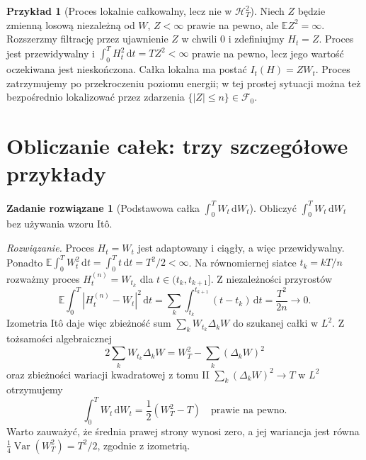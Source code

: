 \documentclass[11pt,a4paper,oneside]{report}
\numberwithin{equation}{chapter}
\theoremstyle{plain}
\theoremstyle{definition}
\newtheorem{przyklad}{Przykład}[chapter]
\newtheorem{zadanie}{Zadanie rozwiązane}[chapter]
\theoremstyle{remark}
\newcommand{\E}{\mathbb{E}}
\newcommand{\Var}{\operatorname{Var}}
\newcommand{\calF}{\mathcal{F}}
\newcommand{\calH}{\mathcal{H}}
\newcommand{\dd}{\mathrm{d}}
\begin{document}
\begin{przyklad}[Proces lokalnie całkowalny, lecz nie w $\calH_T^2$]
Niech $Z$ będzie zmienną losową niezależną od $W$,
$Z<\infty$ prawie na pewno, ale $\E Z^2=\infty$.
Rozszerzmy filtrację przez ujawnienie $Z$ w chwili $0$
i zdefiniujmy $H_t=Z$. Proces jest przewidywalny i
$\int_0^TH_t^2\,\dd t=TZ^2<\infty$ prawie na pewno,
lecz jego wartość oczekiwana jest nieskończona.
Całka lokalna ma postać $I_t(H)=ZW_t$.
Proces zatrzymujemy po przekroczeniu poziomu energii;
w tej prostej sytuacji można też bezpośrednio lokalizować
przez zdarzenia $\{|Z|\le n\}\in\calF_0$.
\end{przyklad}

\section{Obliczanie całek: trzy szczegółowe przykłady}\label{sec:volIII:02:07}
\begin{zadanie}[Podstawowa całka $\int_0^T W_t\,\dd W_t$]\label{zad:W-dW}
Obliczyć $\int_0^T W_t\,\dd W_t$ bez używania wzoru Itô.

\emph{Rozwiązanie.}
Proces $H_t=W_t$ jest adaptowany i ciągły,
a więc przewidywalny. Ponadto
$\E\int_0^TW_t^2\,\dd t=\int_0^Tt\,\dd t=T^2/2<\infty$.
Na równomiernej siatce $t_k=kT/n$ rozważmy proces
$H_t^{(n)}=W_{t_k}$ dla $t\in(t_k,t_{k+1}]$.
Z niezależności przyrostów
\[
\E\int_0^T|H_t^{(n)}-W_t|^2\,\dd t
=\sum_k\int_{t_k}^{t_{k+1}}(t-t_k)\,\dd t
=\frac{T^2}{2n}\longrightarrow0.
\]
Izometria Itô daje więc zbieżność sum
$\sum_kW_{t_k}\Delta_kW$ do szukanej całki w $L^2$.
Z tożsamości algebraicznej
\[
2\sum_kW_{t_k}\Delta_kW
=W_T^2-\sum_k(\Delta_kW)^2
\]
oraz zbieżności wariacji kwadratowej z tomu II
$\sum_k(\Delta_kW)^2\to T$ w $L^2$ otrzymujemy
\[
\int_0^TW_t\,\dd W_t=\frac12(W_T^2-T)
\quad\text{prawie na pewno}.
\tag{2.13}\label{eq:W-dW}
\]
Warto zauważyć, że średnia prawej strony wynosi zero,
a jej wariancja jest równa
$\frac14\Var(W_T^2)=T^2/2$, zgodnie z izometrią.
\end{zadanie}
\end{document}
